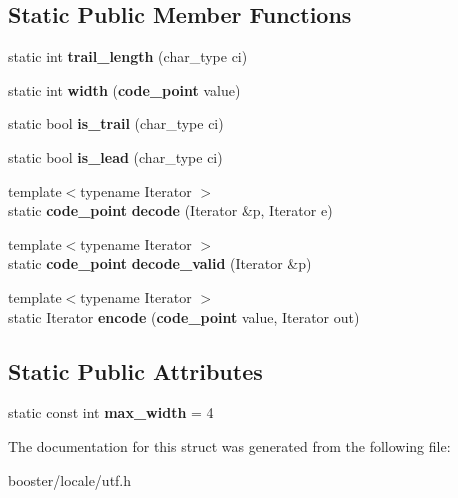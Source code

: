 \subsection*{Static Public Member Functions}
\begin{DoxyCompactItemize}
\item 
static int {\bfseries trail\+\_\+length} (char\+\_\+type ci)\label{structbooster_1_1locale_1_1utf_1_1utf__traits_3_01CharType_00_011_01_4_a201813f53f743fd2328cc4bd2b3f3f83}

\item 
static int {\bfseries width} ({\bf code\+\_\+point} value)\label{structbooster_1_1locale_1_1utf_1_1utf__traits_3_01CharType_00_011_01_4_a932c4075e8acc4fe889d12a84eae0dfb}

\item 
static bool {\bfseries is\+\_\+trail} (char\+\_\+type ci)\label{structbooster_1_1locale_1_1utf_1_1utf__traits_3_01CharType_00_011_01_4_ae50437a7bf1273f744ae85b3f78353e9}

\item 
static bool {\bfseries is\+\_\+lead} (char\+\_\+type ci)\label{structbooster_1_1locale_1_1utf_1_1utf__traits_3_01CharType_00_011_01_4_abefe6df4cc063ebc388c121d039eb64c}

\item 
{\footnotesize template$<$typename Iterator $>$ }\\static {\bf code\+\_\+point} {\bfseries decode} (Iterator \&p, Iterator e)\label{structbooster_1_1locale_1_1utf_1_1utf__traits_3_01CharType_00_011_01_4_a0c3d27f2eac62e5377df448b37eea908}

\item 
{\footnotesize template$<$typename Iterator $>$ }\\static {\bf code\+\_\+point} {\bfseries decode\+\_\+valid} (Iterator \&p)\label{structbooster_1_1locale_1_1utf_1_1utf__traits_3_01CharType_00_011_01_4_a6c9a0f41197269ce0eb0ddc05ff925de}

\item 
{\footnotesize template$<$typename Iterator $>$ }\\static Iterator {\bfseries encode} ({\bf code\+\_\+point} value, Iterator out)\label{structbooster_1_1locale_1_1utf_1_1utf__traits_3_01CharType_00_011_01_4_a0e9c5ad8639e94da1a3e28cc867c9cce}

\end{DoxyCompactItemize}
\subsection*{Static Public Attributes}
\begin{DoxyCompactItemize}
\item 
static const int {\bfseries max\+\_\+width} = 4\label{structbooster_1_1locale_1_1utf_1_1utf__traits_3_01CharType_00_011_01_4_a1652d965a19800f3e0628eddd62bcb7d}

\end{DoxyCompactItemize}


The documentation for this struct was generated from the following file\+:\begin{DoxyCompactItemize}
\item 
booster/locale/utf.\+h\end{DoxyCompactItemize}
